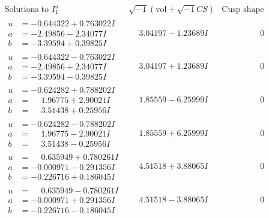 \documentclass[1p]{elsarticle_modified}
\theoremstyle{definition}
\newcommand{\I}{\sqrt{-1}}
\begin{document}
$$\begin{array}{c|c|c}  
\text{Solutions to }I^u_{1}& \I (\text{vol} + \sqrt{-1}CS) & \text{Cusp shape}\\
 \hline 
\begin{aligned}
u &= -0.644322 + 0.763022 I \\
a &= -2.49856 - 2.34077 I \\
b &= -3.39594 + 0.39825 I\end{aligned}
 & \phantom{-}3.04197 - 1.23689 I & \phantom{-0.000000 } 0 \\ \hline\begin{aligned}
u &= -0.644322 - 0.763022 I \\
a &= -2.49856 + 2.34077 I \\
b &= -3.39594 - 0.39825 I\end{aligned}
 & \phantom{-}3.04197 + 1.23689 I & \phantom{-0.000000 } 0 \\ \hline\begin{aligned}
u &= -0.624282 + 0.788202 I \\
a &= \phantom{-}1.96775 + 2.90021 I \\
b &= \phantom{-}3.51438 + 0.25956 I\end{aligned}
 & \phantom{-}1.85559 - 6.25999 I & \phantom{-0.000000 } 0 \\ \hline\begin{aligned}
u &= -0.624282 - 0.788202 I \\
a &= \phantom{-}1.96775 - 2.90021 I \\
b &= \phantom{-}3.51438 - 0.25956 I\end{aligned}
 & \phantom{-}1.85559 + 6.25999 I & \phantom{-0.000000 } 0 \\ \hline\begin{aligned}
u &= \phantom{-}0.635949 + 0.780261 I \\
a &= -0.000971 - 0.291356 I \\
b &= -0.226716 + 0.186045 I\end{aligned}
 & \phantom{-}4.51518 + 3.88065 I & \phantom{-0.000000 } 0 \\ \hline\begin{aligned}
u &= \phantom{-}0.635949 - 0.780261 I \\
a &= -0.000971 + 0.291356 I \\
b &= -0.226716 - 0.186045 I\end{aligned}
 & \phantom{-}4.51518 - 3.88065 I & \phantom{-0.000000 } 0 \\ \hline\begin{aligned}

\end{aligned}
\end{array}$$
\end{document}
